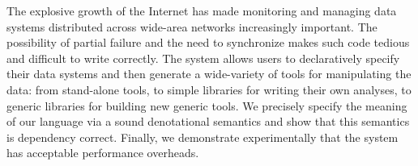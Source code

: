 The explosive growth of the Internet has made monitoring and managing
data systems distributed across wide-area networks increasingly
important. The possibility of partial failure and the need to
synchronize makes such code tedious and difficult to write correctly.
The \padsd{} system allows users to declaratively specify their 
data systems and then generate a wide-variety of tools for 
manipulating the data: from
stand-alone tools, to simple libraries for writing their own analyses,
to generic libraries for building new generic tools.  We precisely
specify the meaning of our language via a sound denotational
semantics and show that this semantics is dependency correct. Finally,
we demonstrate experimentally that the system has
acceptable performance overheads.
